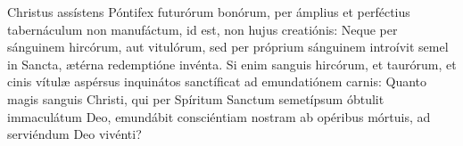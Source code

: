 Christus assístens Póntifex futurórum bonórum,
	per ámplius et perféctius tabernáculum non manufáctum,
	id est, non hujus creatiónis:
	Neque per sánguinem hircórum, aut vitulórum,
	sed per próprium sánguinem introívit semel in Sancta, ætérna redemptióne invénta.
Si enim sanguis hircórum, et taurórum,
	et cinis vítulæ aspérsus inquinátos sanctíficat ad emundatiónem carnis:
Quanto magis sanguis Christi,
	qui per Spíritum Sanctum semetípsum óbtulit immaculátum Deo,
	emundábit consciéntiam nostram ab opéribus mórtuis,
	ad serviéndum Deo vivénti?
